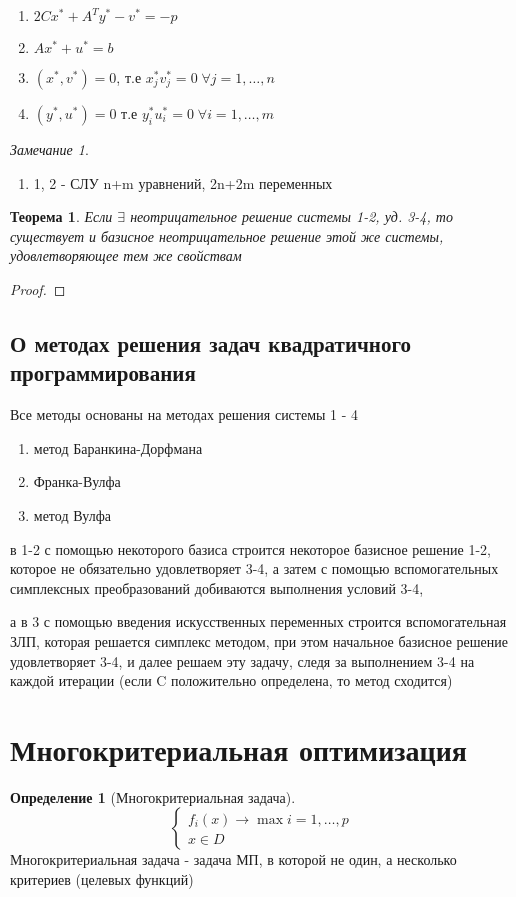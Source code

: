 \documentclass[a4paper]{article}
\newtheorem{theorem}{Теорема}[section]
\theoremstyle{definition}
\newtheorem*{definition}{Определение}
\theoremstyle{remark}
\newtheorem*{remark}{Замечание}
\begin{document}
\begin{enumerate}
    \item $2Cx^* + A^T y^* - v^* = -p$
    \item $Ax^* + u^* = b$
    \item $(x^*, v^*) = 0$, т.е $x_j^* v_j^* = 0\; \forall j = 1, \dots, n$
    \item $(y^*, u^*) = 0$ т.е $y_i^* u_i^* = 0\; \forall i = 1, \dots, m$
\end{enumerate}  
\begin{remark}
    \begin{enumerate}
        \item 1, 2 - СЛУ n+m уравнений, 2n+2m переменных
    \end{enumerate}
\end{remark}
\begin{theorem}
    Если $\exists$ неотрицательное решение системы 1-2, уд. 3-4, то существует и базисное неотрицательное решение этой же системы, удовлетворяющее тем же свойствам
\end{theorem}
\begin{proof}

\end{proof}
\subsection{О методах решения задач квадратичного программирования}
Все методы основаны на методах решения системы 1 - 4 

\begin{enumerate}
    \item метод Баранкина-Дорфмана
    \item Франка-Вулфа
    \item метод Вулфа
\end{enumerate}
в 1-2 с помощью некоторого базиса строится некоторое базисное решение 1-2, которое не обязательно удовлетворяет 3-4, а затем с помощью вспомогательных симплексных преобразований добиваются выполнения условий 3-4,

а в 3 с помощью введения искусственных переменных строится вспомогательная ЗЛП, которая решается симплекс методом, при этом начальное базисное решение удовлетворяет 3-4, и далее решаем эту задачу, следя за выполнением 3-4 на каждой итерации (если C положительно определена, то метод сходится)
\section{Многокритериальная оптимизация}
\begin{definition}[Многокритериальная задача]
    \[\begin{cases}
        f_i(x)\to \max i = 1, \dots, p\\
        x\in D
    \end{cases}\]
    Многокритериальная задача - задача МП, в которой не один, а несколько критериев (целевых функций)
\end{definition}
\end{document}

